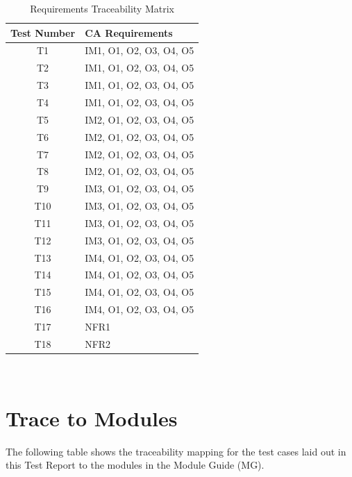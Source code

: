 \documentclass[12pt, titlepage]{article}
\begin{document}
\begin{table} [H]
  \caption{Requirements Traceability Matrix}
  \label{Table:Table_Traceability_CA}  
\begin{tabular}{|c|p{8cm}|}
  \hline	
  \textbf{Test Number} & \textbf{CA Requirements}\\
  \hline 
   T1& IM1, O1, O2, O3, O4, O5\\ \hline
   T2& IM1, O1, O2, O3, O4, O5\\ \hline
   T3& IM1, O1, O2, O3, O4, O5\\ \hline
   T4& IM1, O1, O2, O3, O4, O5\\ \hline
   T5& IM2, O1, O2, O3, O4, O5\\ \hline
   T6& IM2, O1, O2, O3, O4, O5\\ \hline
   T7& IM2, O1, O2, O3, O4, O5\\ \hline
   T8& IM2, O1, O2, O3, O4, O5\\ \hline
   T9& IM3, O1, O2, O3, O4, O5\\ \hline
   T10& IM3, O1, O2, O3, O4, O5\\ \hline
   T11& IM3, O1, O2, O3, O4, O5\\ \hline
   T12& IM3, O1, O2, O3, O4, O5\\ \hline
   T13& IM4, O1, O2, O3, O4, O5\\ \hline
   T14& IM4, O1, O2, O3, O4, O5\\ \hline
   T15& IM4, O1, O2, O3, O4, O5\\ \hline
   T16& IM4, O1, O2, O3, O4, O5\\ \hline
   T17& NFR1\\ \hline
   T18& NFR2\\ \hline

\end{tabular}\\
\end{table}
		
\section{Trace to Modules}	 \label{sec_trace_modules}
The following table shows the traceability mapping for the test cases laid out in this Test Report to the
modules in the Module Guide (MG).
\end{document}

